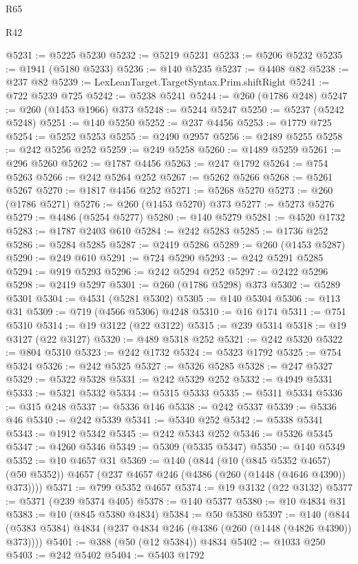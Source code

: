 \begin{lexlean}{R65}
\begin{lexlean}{R42}
\begin{coremodule}
{{{{{{{{{{{{{{{{{{{{{{{{{{{{{{{{{{{{{{{{{{{{{{{{{{{{{{{{{{{{{{{{{{{{{{{{{{{{{{{{{{{{{{{{{{{{{{{{{{{{{{{{{{{{{{{{{{{{{{{{{{{{{{{{{{{{{{{{{{{{{{{{{{{{{{{{{{{{{{{{{{{{{{{{{{{{{{{{{{{{{{{{@5231 := @5225 @5230
@5232 := @5219 @5231
@5233 := @5206 @5232
@5235 := @1941 (@5180 @5233)
@5236 := @140 @5235
@5237 := @4408 @82
@5238 := @237 @82
@5239 := LexLeanTarget.TargetSyntax.Prim.shiftRight
@5241 := @722 @5239 @725
@5242 := @5238 @5241
@5244 := @260 (@1786 @248)
@5247 := @260 (@1453 @1966) @373
@5248 := @5244 @5247
@5250 := @5237 (@5242 @5248)
@5251 := @140 @5250
@5252 := @237 @4456
@5253 := @1779 @725
@5254 := @5252 @5253
@5255 := @2490 @2957
@5256 := @2489 @5255
@5258 := @242 @5256 @252
@5259 := @249 @5258
@5260 := @1489 @5259
@5261 := @296 @5260
@5262 := @1787 @4456
@5263 := @247 @1792
@5264 := @754 @5263
@5266 := @242 @5264 @252
@5267 := @5262 @5266
@5268 := @5261 @5267
@5270 := @1817 @4456 @252
@5271 := @5268 @5270
@5273 := @260 (@1786 @5271)
@5276 := @260 (@1453 @5270) @373
@5277 := @5273 @5276
@5279 := @4486 (@5254 @5277)
@5280 := @140 @5279
@5281 := @4520 @1732
@5283 := @1787 @2403 @610
@5284 := @242 @5283
@5285 := @1736 @252
@5286 := @5284 @5285
@5287 := @2419 @5286
@5289 := @260 (@1453 @5287)
@5290 := @249 @610
@5291 := @724 @5290
@5293 := @242 @5291 @5285
@5294 := @919 @5293
@5296 := @242 @5294 @252
@5297 := @2422 @5296
@5298 := @2419 @5297
@5301 := @260 (@1786 @5298) @373
@5302 := @5289 @5301
@5304 := @4531 (@5281 @5302)
@5305 := @140 @5304
@5306 := @113 @31
@5309 := @719 (@4566 @5306) @4248
@5310 := @16 @174
@5311 := @751 @5310
@5314 := @19 @3122 (@22 @3122)
@5315 := @239 @5314
@5318 := @19 @3127 (@22 @3127)
@5320 := @489 @5318 @252
@5321 := @242 @5320
@5322 := @804 @5310
@5323 := @242 @1732
@5324 := @5323 @1792
@5325 := @754 @5324
@5326 := @242 @5325
@5327 := @5326 @5285
@5328 := @247 @5327
@5329 := @5322 @5328
@5331 := @242 @5329 @252
@5332 := @4949 @5331
@5333 := @5321 @5332
@5334 := @5315 @5333
@5335 := @5311 @5334
@5336 := @315 @248
@5337 := @5336 @146
@5338 := @242 @5337
@5339 := @5336 @46
@5340 := @242 @5339
@5341 := @5340 @252
@5342 := @5338 @5341
@5343 := @1912 @5342
@5345 := @242 @5343 @252
@5346 := @5326 @5345
@5347 := @4260 @5346
@5349 := @5309 (@5335 @5347)
@5350 := @140 @5349
@5352 := @10 @4657 @31
@5369 := @140
    (@844
      (@10 (@845 @5352 @4657) (@50 @5352))
      @4657
      (@237 @4657 @246 (@4386 (@260 (@1448 (@4646 @4390)) @373))))
@5371 := @799 @5352 @4657
@5374 := @19 @3132 (@22 @3132)
@5377 := @5371 (@239 @5374 @405)
@5378 := @140 @5377
@5380 := @10 @4834 @31
@5383 := @10 (@845 @5380 @4834)
@5384 := @50 @5380
@5397 := @140 (@844 (@5383 @5384) @4834 (@237 @4834 @246 (@4386 (@260 (@1448 (@4826 @4390)) @373))))
@5401 := @388 (@50 (@12 @5384)) @4834
@5402 := @1033 @250
@5403 := @242 @5402
@5404 := @5403 @1792
}}}}}}}}}}}}}}}}}}}}}}}}}}}}}}}}}}}}}}}}}}}}}}}}}}}}}}}}}}}}}}}}}}}}}}}}}}}}}}}}}}}}}}}}}}}}}}}}}}}}}}}}}}}}}}}}}}}}}}}}}}}}}}}}}}}}}}}}}}}}}}}}}}}}}}}}}}}}}}}}}}}}}}}}}}}}}}}}}}}}}}}}
\end{coremodule}
\end{lexlean}
\end{lexlean}
